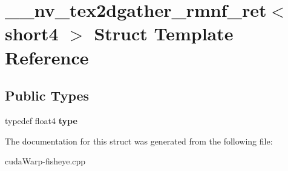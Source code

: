 \hypertarget{struct____nv__tex2dgather__rmnf__ret_3_01short4_01_4}{}\section{\+\_\+\+\_\+nv\+\_\+tex2dgather\+\_\+rmnf\+\_\+ret$<$ short4 $>$ Struct Template Reference}
\label{struct____nv__tex2dgather__rmnf__ret_3_01short4_01_4}
\subsection*{Public Types}
\begin{DoxyCompactItemize}
\item 
typedef float4 {\bfseries type}\hypertarget{struct____nv__tex2dgather__rmnf__ret_3_01short4_01_4_ac217908846fda19f665c1a36647e8a2a}{}\label{struct____nv__tex2dgather__rmnf__ret_3_01short4_01_4_ac217908846fda19f665c1a36647e8a2a}

\end{DoxyCompactItemize}


The documentation for this struct was generated from the following file\+:\begin{DoxyCompactItemize}
\item 
cuda\+Warp-\/fisheye.\+cpp\end{DoxyCompactItemize}

